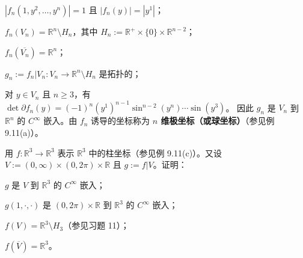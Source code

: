 \begin{exercises}
\begin{subitems}
$ \left|f_{n}(1, y^{2}, \ldots, y^{n})\right| = 1 $ 且 $ \left|f_{n}(y)\right| = \left|y^{1}\right| $；

\item

$ f_{n}(V_{n}) = \mathbb{R}^{n}\setminus H_{n} $，其中 $ H_{n} := \mathbb{R}^{+} \times \{0\} \times \mathbb{R}^{n-2} $；

\item

$ f_{n}(\overline{V_{n}}) = \mathbb{R}^{n} $；

\item

$ g_{n} := f_{n}|V_{n} : V_{n} \to \mathbb{R}^{n}\setminus H_{n} $ 是拓扑的；

\item

对 $ y \in V_{n} $ 且 $ n \ge 3 $，有 $ \det\partial f_{n}(y) = (-1)^{n}(y^{1})^{n-1}\sin^{n-2}(y^{n}) \cdots \sin(y^{3}) $。
因此 $ g_{n} $ 是 $ V_{n} $ 到 $ \mathbb{R}^{n} $ 的 $ C^{\infty} $ 嵌入。由 $ f_{n} $ 诱导的坐标称为 \textbf{$ n $ 维极坐标（或球坐标）}（参见例 9.11(a)）。

\end{subitems}

\item

用 $ f : \mathbb{R}^{3} \to \mathbb{R}^{3} $ 表示 $ \mathbb{R}^{3} $ 中的柱坐标（参见例 9.11(c)）。又设 $ V := (0, \infty) \times (0, 2\pi) \times \mathbb{R} $ 且 $ g := f|V $。证明：

\begin{items}
\item

$ g $ 是 $ V $ 到 $ \mathbb{R}^{3} $ 的 $ C^{\infty} $ 嵌入；

\item

$ g(1, \cdot, \cdot) $ 是 $ (0, 2\pi) \times \mathbb{R} $ 到 $ \mathbb{R}^{3} $ 的 $ C^{\infty} $ 嵌入；

\item

$ f(V) = \mathbb{R}^{3}\setminus H_{3} $（参见习题 11）；

\item

$ f(\overline{V}) = \mathbb{R}^{3} $。

\end{items}

\item


\end{exercises}
